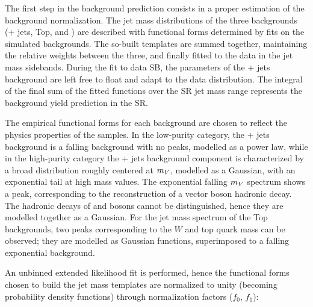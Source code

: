 The first step in the background prediction consists in a proper estimation of the background normalization. The jet mass distributions of the three backgrounds (\V + jets, Top, and \VV) are described with functional forms determined by fits on the simulated backgrounds. The so-built templates are summed together, maintaining the relative weights between the three, and finally fitted to the data in the jet mass sidebands. During the fit to data SB, the parameters of the \V + jets background are left free to float and adapt to the data distribution. The integral of the final sum of the fitted functions over the SR jet mass range represents the background yield prediction in the SR.


\noindent The empirical functional forms for each background are chosen to reflect the physics properties of the samples. In the low-purity category, the \V+ jets background is a falling background with no peaks, modelled as a power law, while in the high-purity category the \V + jets background component is characterized by a broad distribution roughly centered at $m_V$, modelled as a Gaussian, with an exponential tail at high mass values. The exponential falling \VV $m_V$ spectrum shows a peak, corresponding to the reconstruction of a vector boson hadronic decay. The hadronic decays of \W and \Z bosons cannot be distinguished, hence they are modelled together as a Gaussian. For the jet mass spectrum of the Top backgrounds, two peaks corresponding to the $W$ and top quark mass can be observed; they are modelled as Gaussian functions, superimposed to a falling exponential background.

\noindent An unbinned extended likelihood fit is performed, hence the functional forms chosen to build the jet mass templates are normalized to unity (becoming probability density functions) through normalization factors ($f_0$, $f_1$):

